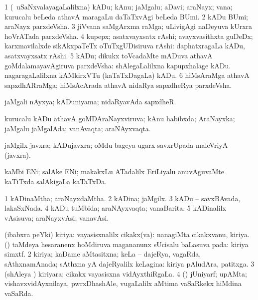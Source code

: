 \bentry
{}
\gl{\nA}
\bmng
\bnum
\num{1} (\kanmu\ uSaNxvalayagaLalilxna) kADu; kAnu; jaMgalu; aDavi; araNayx; vana; kurucalu beLeda athavA maragaLu daTaTxvAgi beLeda BUmi. 
\num{2} kADu BUmi; araNayx parxdeVsha. 
\num{3} jiVvana saMgArxma raMga; uLivigAgi naDeyuva kUrxra hoVrATada parxdeVsha. 
\num{4} kupepx; asatxvayxsatx rAshi; avayxvasithxta guDeDx; karxmavilalxde sikAkxpaTeTx oTuTxgUDisiruva rAshi:  daphatxragaLa kADu, asatxvayxsatx rAshi. 
\num{5} kADu; dikukx toVcadaMte mADuva athavA goMdalamayavAgiruva parxdeVsha:  shAlegaLalilxna kapupxhalage kADu.  nagaragaLalilxna kAMkirxVTu (kaTaTxDagaLa) kADu. 
\num{6} hiMsAraMga athavA sapxdhARraMga; hiMsAcArada athavA nidaRya sapxdheRya parxdeVsha. 
\enum
\emng

\noindent
\gl{\pagu}
\bmng
{} jaMgali nAyxya; kADuniyama; nidaRyavAda sapxdheR. 
\emng
\eentry

\bentry
{}
\gl{\gu}
\bmng
kurucalu kADu athavA goMDAraNayxviruva; kAnu habibxda; AraNayxka; jaMgalu jaMgalAda; vanAvaqta; araNAyxvaqta. 
\emng
\eentry

\bentry
{}
\gl{\nA}
\bmng
jaMgilx javxra; kADujavxra; oMdu bageya ugarx savxrUpada maleVriyA (javxra). 
\emng
\eentry

\bentry
{}
\gl{\nA}
\bmng
kaMbi ENi; salAke ENi; makakxLu ATadalilx EriLiyalu anuvAguvaMte kaTiTxda salAkigaLa kaTaTxDa.  
\emng
\eentry

\bentry
{} 
\gl{\gu}
\bmng
\bnum
\num{1} kADinaMtha; araNayxdaMtha. 
\num{2} kADina; jaMgilx. 
\num{3} kADu -- savxBAvada, lakaSxNada. 
\num{4} kADu tuMbida; araNAyxvaqta; vanaBarita. 
\num{5} kADinalilx vAsisuva; araNayxvAsi; vanavAsi. 
\enum
\emng
\eentry

\bentry
{}
\gl{\gu}
\bmng
\bnum
{} (ibabxra peYki) kiriya: 
\banum
{} vayasisxnalilx cikakx(va):  nanagiMta cikakxvanu, kiriya. 
 (\kanmu) taMdeya hesaranenx hoMdiruva magananunx sUcisalu baLasuva pada:   kiriya simxtf. 
\eanum
\numie
\num{2} kiriya; kaDame aMtasitxna; keLa -- dajeRya, vagaRda, sAthxnamAnada; sAthxna yA dajeRyalilx keLagina:   kiriya pAludAra, patitxga. 
\num{3} (shAleya \vi) kiriyara; cikakx vayasisxna vidAyxthiRgaLa. 
\num{4} (\ame) jUniyarf; upAMta; vishavxvidAyxnilaya, pwrxDhashAle, \mo vugaLalilx aMtima vaSaRkekx hiMdina vaSaRda. 
\enum
\emng
\eentry

